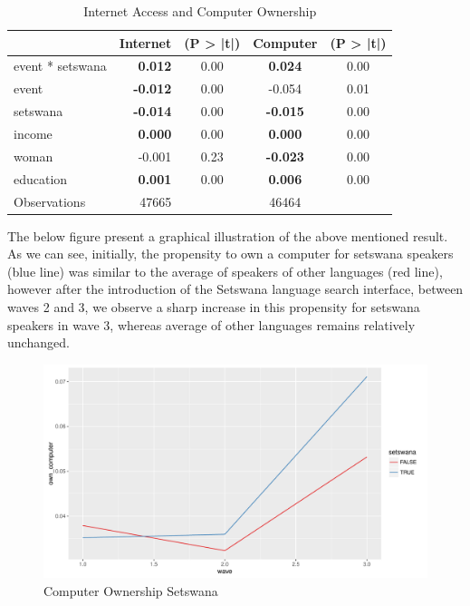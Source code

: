 \documentclass[a4paper,british]{article}\usepackage[]{graphicx}\usepackage[]{color}
\makeatletter
\def\maxwidth{ %
  \ifdim\Gin@nat@width>\linewidth
    \linewidth
  \else
    \Gin@nat@width
  \fi
}
\newenvironment{knitrout}{}{} %
\providecommand{\tabularnewline}{\\}
\makeatother
\begin{document}
\begin{table}

\caption{Internet Access and Computer Ownership}

\begin{centering}
\label{tab:esti-full}
\par\end{centering}
\centering{}%
\begin{tabular}{|l|r|c|c|c|}
\hline 
 &
Internet &
(P > |t|) &
Computer &
(P > |t|)\tabularnewline
\hline 
\hline 
event {*} setswana &
\textbf{0.012} &
0.00 &
\textbf{0.024} &
0.00\tabularnewline
\hline 
event &
\textbf{-0.012} &
0.00 &
-0.054 &
0.01\tabularnewline
\hline 
setswana &
\textbf{-0.014} &
0.00 &
\textbf{-0.015} &
0.00\tabularnewline
\hline 
income &
\textbf{0.000} &
0.00 &
\textbf{0.000} &
0.00\tabularnewline
\hline 
woman &
-0.001 &
0.23 &
\textbf{-0.023} &
0.00\tabularnewline
\hline 
education &
\textbf{0.001} &
0.00 &
\textbf{0.006} &
0.00\tabularnewline
\hline 
Observations &
47665 &
 &
46464 &
\tabularnewline
\hline 
\end{tabular}
\end{table}

The below figure present a graphical illustration of the above mentioned
result. As we can see, initially, the propensity to own a computer
for setswana speakers (blue line) was similar to the average of speakers
of other languages (red line), however after the introduction of the
Setswana language search interface, between waves 2 and 3, we observe
a sharp increase in this propensity for setswana speakers in wave
3, whereas average of other languages remains relatively unchanged.

\begin{figure}[H]
\caption{Computer Ownership Setswana}

\begin{knitrout}
\color{fgcolor}
\includegraphics[width=\maxwidth]{../Making-Next-Billion-Demand-Access/misc/latex-gg2_5-1} 

\end{knitrout}
\end{figure}
\end{document}
